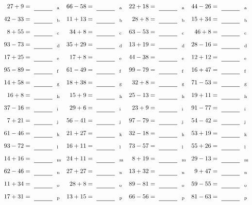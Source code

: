 \documentclass
[
  draft    = true,
  fontsize = 11pt,
  parskip  = half-
]
{scrartcl}
\begin{document}
\clearpage
\begin{align*}
    \pline{27+9}&=\rline{a}
  & \pline{66-58}&=\rline{a}
  & \pline{22+18}&=\rline{a}
  & \pline{44-26}&=\rline{a} \\[1ex]
    \pline{42-33}&=\rline{b}
  & \pline{11+13}&=\rline{b}
  & \pline{28+8}&=\rline{b}
  & \pline{15+34}&=\rline{b} \\[1ex]
    \pline{8+55}&=\rline{c}
  & \pline{34+8}&=\rline{c}
  & \pline{63-53}&=\rline{c}
  & \pline{46+8}&=\rline{c} \\[1ex]
    \pline{93-73}&=\rline{d}
  & \pline{35+29}&=\rline{d}
  & \pline{13+19}&=\rline{d}
  & \pline{28-16}&=\rline{d} \\[1ex]
    \pline{17+25}&=\rline{e}
  & \pline{17+8}&=\rline{e}
  & \pline{44-38}&=\rline{e}
  & \pline{12+12}&=\rline{e} \\[1ex]
    \pline{95-89}&=\rline{f}
  & \pline{61-49}&=\rline{f}
  & \pline{99-79}&=\rline{f}
  & \pline{16+47}&=\rline{f} \\[1ex]
    \pline{14+58}&=\rline{g}
  & \pline{18+38}&=\rline{g}
  & \pline{32+8}&=\rline{g}
  & \pline{71-53}&=\rline{g} \\[1ex]
    \pline{16+8}&=\rline{h}
  & \pline{15+9}&=\rline{h}
  & \pline{25-13}&=\rline{h}
  & \pline{19+11}&=\rline{h} \\[1ex]
    \pline{37-16}&=\rline{i}
  & \pline{29+6}&=\rline{i}
  & \pline{23+9}&=\rline{i}
  & \pline{91-77}&=\rline{i} \\[1ex]
    \pline{7+21}&=\rline{j}
  & \pline{56-41}&=\rline{j}
  & \pline{97-79}&=\rline{j}
  & \pline{54-42}&=\rline{j} \\[1ex]
    \pline{61-46}&=\rline{k}
  & \pline{21+27}&=\rline{k}
  & \pline{32-18}&=\rline{k}
  & \pline{53+19}&=\rline{k} \\[1ex]
    \pline{93-72}&=\rline{l}
  & \pline{16+11}&=\rline{l}
  & \pline{73-57}&=\rline{l}
  & \pline{55+26}&=\rline{l} \\[1ex]
    \pline{14+16}&=\rline{m}
  & \pline{24+11}&=\rline{m}
  & \pline{8+19}&=\rline{m}
  & \pline{29-13}&=\rline{m} \\[1ex]
    \pline{62-46}&=\rline{n}
  & \pline{27+27}&=\rline{n}
  & \pline{13+32}&=\rline{n}
  & \pline{9+47}&=\rline{n} \\[1ex]
    \pline{11+34}&=\rline{o}
  & \pline{28+8}&=\rline{o}
  & \pline{89-81}&=\rline{o}
  & \pline{59-55}&=\rline{o} \\[1ex]
    \pline{17+31}&=\rline{p}
  & \pline{13+15}&=\rline{p}
  & \pline{66-56}&=\rline{p}
  & \pline{81-63}&=\rline{p}
\end{align*}
\end{document}
